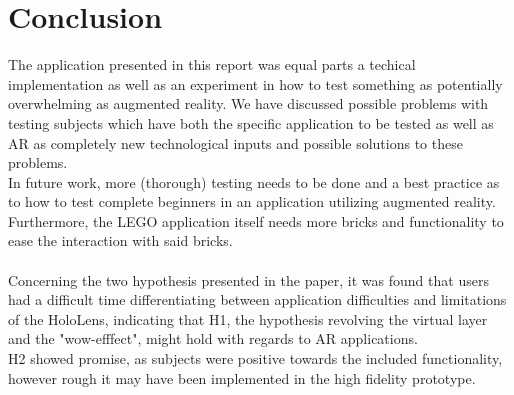 
\section{Conclusion}
The application presented in this report was equal parts a techical implementation as well as an experiment in how to test something as potentially overwhelming as augmented reality. We have discussed possible problems with testing subjects which have both the specific application to be tested as well as AR as completely new technological inputs and possible solutions to these problems.\\
In future work, more (thorough) testing needs to be done and a best practice as to how to test complete beginners in an application utilizing augmented reality. Furthermore, the LEGO application itself needs more bricks and functionality to ease the interaction with said bricks. \\
\\
Concerning the two hypothesis presented in the paper, it was found that users had a difficult time differentiating between application difficulties and limitations of the HoloLens, indicating that H1, the hypothesis revolving the virtual layer and the "wow-efffect", might hold with regards to AR applications.\\
H2 showed promise, as subjects were positive towards the included functionality, however rough it may have been implemented in the high fidelity prototype. 
